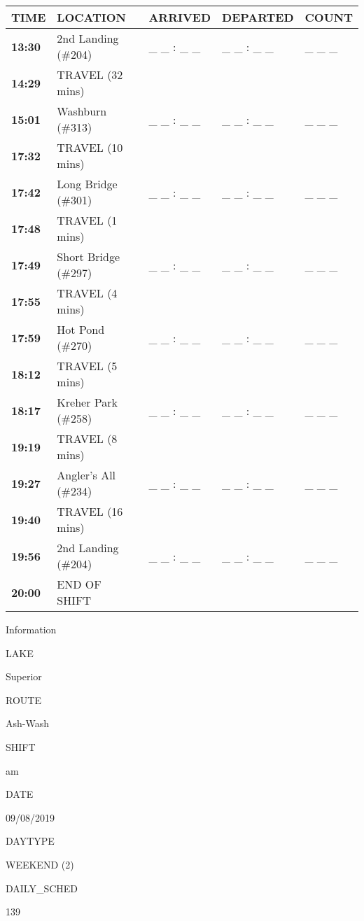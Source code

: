 \documentclass[]{article}
\begin{document}
\begin{tabular}{>{\bfseries}lllll}
\toprule
\textbf{TIME} & \textbf{LOCATION} & \textbf{ARRIVED} & \textbf{DEPARTED} & \textbf{COUNT}\\
\midrule
13:30 & 2nd Landing (\#204) & \_ \_ : \_ \_ & \_ \_ : \_ \_ & \_ \_ \_\\
14:29 & TRAVEL (32 mins) &  &  & \\
15:01 & Washburn (\#313) & \_ \_ : \_ \_ & \_ \_ : \_ \_ & \_ \_ \_\\
17:32 & TRAVEL (10 mins) &  &  & \\
17:42 & Long Bridge (\#301) & \_ \_ : \_ \_ & \_ \_ : \_ \_ & \_ \_ \_\\
17:48 & TRAVEL (1 mins) &  &  & \\
17:49 & Short Bridge (\#297) & \_ \_ : \_ \_ & \_ \_ : \_ \_ & \_ \_ \_\\
17:55 & TRAVEL (4 mins) &  &  & \\
17:59 & Hot Pond (\#270) & \_ \_ : \_ \_ & \_ \_ : \_ \_ & \_ \_ \_\\
18:12 & TRAVEL (5 mins) &  &  & \\
18:17 & Kreher Park (\#258) & \_ \_ : \_ \_ & \_ \_ : \_ \_ & \_ \_ \_\\
19:19 & TRAVEL (8 mins) &  &  & \\
19:27 & Angler's All (\#234) & \_ \_ : \_ \_ & \_ \_ : \_ \_ & \_ \_ \_\\
19:40 & TRAVEL (16 mins) &  &  & \\
19:56 & 2nd Landing (\#204) & \_ \_ : \_ \_ & \_ \_ : \_ \_ & \_ \_ \_\\
20:00 & END OF SHIFT &  &  & \\
\bottomrule
\end{tabular}\newpage

Information

LAKE

Superior

ROUTE

Ash-Wash

SHIFT

am

DATE

09/08/2019

DAYTYPE

WEEKEND (2)

DAILY\_SCHED

139

\vspace{24pt}
\end{document}
